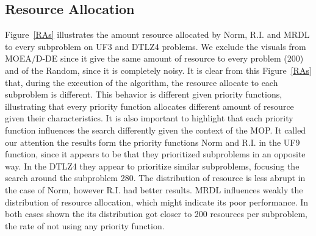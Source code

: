






\subsection{Resource Allocation}

Figure~\ref{RAs} illustrates the amount resource allocated by Norm, R.I. and MRDL to every subproblem on UF3 and DTLZ4 problems. We exclude the visuals from MOEA/D-DE since it give the same amount of resource to every problem (200) and of the Random, since it is completely noisy. It is clear from this Figure~\ref{RAs} that, during the execution of the algorithm, the resource allocate to each subproblem is different. This behavior is different given priority functions, illustrating that every priority function allocates different amount of resource given their characteristics. It is also important to highlight that each priority function influences the search differently given the context of the MOP. It called our attention the results form the priority functions Norm and R.I. in the UF9 function, since it appears to be that they prioritized subproblems in an opposite way. In the DTLZ4 they appear to prioritize similar subproblems, focusing the search around the subproblem 280. The distribution of resource is less abrupt in the case of Norm, however R.I. had better results. MRDL influences weakly the distribution of resource allocation, which might indicate its poor performance. In both cases shown the its distribution got closer to 200 resources per subproblem, the rate of not using any priority function. 





